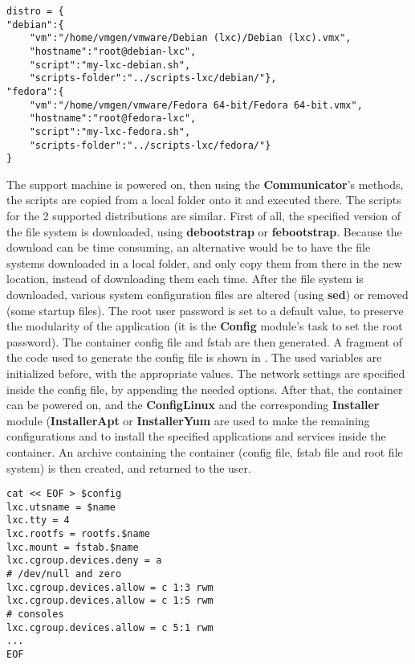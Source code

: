 \lstset{language=Python,caption=Dictionary for selecting OS specific elements,label=lst:lxc-dict-vm}
\begin{lstlisting}
distro = {
"debian":{
	"vm":"/home/vmgen/vmware/Debian (lxc)/Debian (lxc).vmx",
	"hostname":"root@debian-lxc",
	"script":"my-lxc-debian.sh",
	"scripts-folder":"../scripts-lxc/debian/"},
"fedora":{
	"vm":"/home/vmgen/vmware/Fedora 64-bit/Fedora 64-bit.vmx",
	"hostname":"root@fedora-lxc",
	"script":"my-lxc-fedora.sh",
	"scripts-folder":"../scripts-lxc/fedora/"}
}
\end{lstlisting}

The support machine is powered on, then using the \textbf{Communicator}'s
methods, the scripts are copied from a local folder onto it and executed there.
The scripts for the 2 supported distributions are similar. First of all, the
specified version of the file system is downloaded, using \textbf{debootstrap}
or \textbf{febootstrap}. Because the download can be time consuming, an
alternative would be to have the file systems downloaded in a local folder, and
only copy them from there in the new location, instead of downloading them each
time. After the file system is downloaded, various system configuration files
are altered (using \textbf{sed}) or removed (some startup files). The root user
password is set to a default value, to preserve the modularity of the
application (it is the \textbf{Config} module's task to set the root password).
The container config file and fstab are then generated. A fragment of the code
used to generate the config file is shown in
. The used variables are initialized
before, with the appropriate values. The network settings are specified inside
the config file, by appending the needed options. After that, the container can be powered on, and the
\textbf{ConfigLinux} and the corresponding \textbf{Installer} module
(\textbf{InstallerApt} or \textbf{InstallerYum} are used to make the remaining
configurations and to install the specified applications and services inside
the container. An archive containing the container (config file, fstab file and
root file system) is then created, and returned to the user.

\lstset{language=Bash,caption=Generating the config file,label=lst:lxc-config-gen}
\begin{lstlisting}
cat << EOF > $config
lxc.utsname = $name
lxc.tty = 4
lxc.rootfs = rootfs.$name
lxc.mount = fstab.$name
lxc.cgroup.devices.deny = a
# /dev/null and zero
lxc.cgroup.devices.allow = c 1:3 rwm
lxc.cgroup.devices.allow = c 1:5 rwm
# consoles
lxc.cgroup.devices.allow = c 5:1 rwm
...
EOF
\end{lstlisting}
